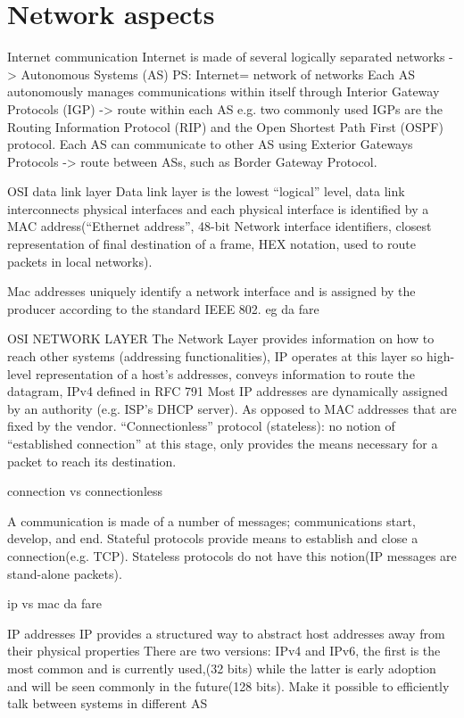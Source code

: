 \chapter{Network aspects}
Internet communication 
Internet is made of several logically separated networks -> Autonomous Systems (AS)
PS: Internet= network of networks
Each AS autonomously manages communications within itself through Interior Gateway Protocols (IGP) -> route within each AS
e.g. two commonly used IGPs are the Routing Information Protocol (RIP) and the Open Shortest Path First (OSPF) protocol.
Each AS can communicate to other AS using Exterior Gateways Protocols -> route between ASs, such as Border Gateway Protocol.


OSI data link layer
Data link layer is the lowest “logical” level, data link interconnects physical interfaces and each physical interface is identified by a MAC address(“Ethernet address”, 48-bit Network interface identifiers, closest representation of final destination of a frame, HEX notation, used to route packets in local networks).



Mac addresses uniquely identify a network interface and is assigned by the producer according to the standard IEEE 802. 
eg da fare 

OSI NETWORK LAYER
The Network Layer provides information on how to reach other systems (addressing functionalities), IP operates at this layer so high-level representation of a host’s addresses, conveys information to route the datagram, IPv4 defined in RFC 791
Most IP addresses are dynamically assigned by an authority (e.g. ISP’s DHCP server). As opposed to MAC addresses that are fixed by the vendor. “Connectionless” protocol (stateless): no notion of “established connection” at this stage, only provides the means necessary for a packet to reach its destination.

connection vs connectionless

A communication is made of a number of messages; communications start, develop, and end. Stateful protocols provide means to establish and close a connection(e.g. TCP).
Stateless protocols do not have this notion(IP messages are stand-alone packets).

ip vs mac da fare

IP addresses
IP provides a structured way to abstract host addresses away from their physical properties
There are two versions: IPv4 and IPv6, the first is the most common and is currently used,(32 bits) while the latter is early adoption and will be seen commonly in the future(128 bits).
Make it possible to efficiently talk between systems in different AS

